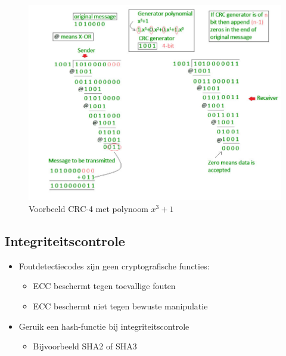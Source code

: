 \documentclass{article}
\begin{document}
\begin{figure}[H]
    \centering
    \includegraphics[width=\textwidth]{Screenshot_20200420_120455.png}
    \caption{Voorbeeld CRC-4 met polynoom $x^3 + 1$}
\end{figure}


\subsection{Integriteitscontrole}
\begin{itemize}
    \item Foutdetectiecodes zijn geen cryptografische functies:
    \begin{itemize}
        \item ECC beschermt tegen toevallige fouten
        \item ECC beschermt niet tegen bewuste manipulatie
    \end{itemize}
    \item Geruik een hash-functie bij integriteitscontrole
    \begin{itemize}
        \item Bijvoorbeeld SHA2 of SHA3
    \end{itemize}
\end{itemize}
\end{document}
